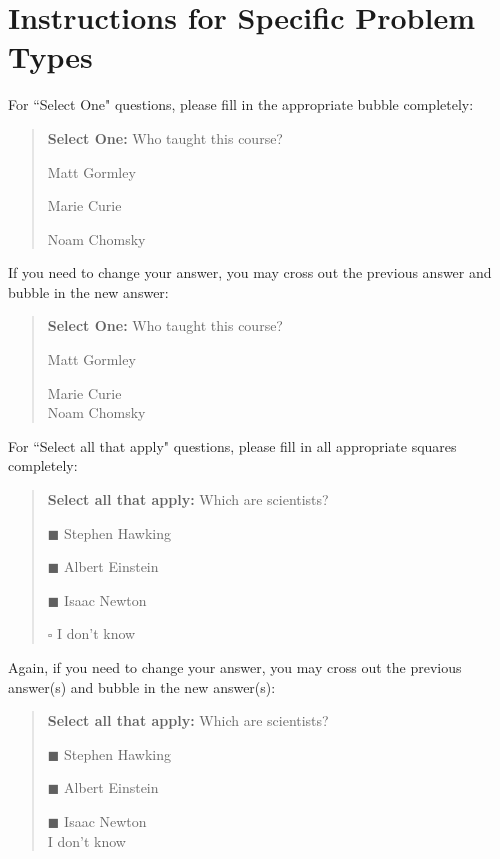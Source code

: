 \section*{Instructions for Specific Problem Types}

For ``Select One" questions, please fill in the appropriate bubble completely:

\begin{quote}
\textbf{Select One:} Who taught this course?
\begin{list}{}
     \item\CIRCLE{} Matt Gormley
     \item\Circle{} Marie Curie
     \item\Circle{} Noam Chomsky
\end{list}
\end{quote}

If you need to change your answer, you may cross out the previous answer and bubble in the new answer:

\begin{quote}
\textbf{Select One:} Who taught this course?
\begin{list}{}
     \item\CIRCLE{} Matt Gormley
     \item\Circle{} Marie Curie\\
     \xcancel{\CIRCLE}{} Noam Chomsky
\end{list}
\end{quote}


For ``Select all that apply" questions, please fill in all appropriate squares completely:

\begin{quote}
\textbf{Select all that apply:} Which are scientists?
    \begin{list}{}
    \item $\blacksquare$ Stephen Hawking 
    \item $\blacksquare$ Albert Einstein
    \item $\blacksquare$ Isaac Newton
    \item $\square$ I don't know
\end{list}
\end{quote}

Again, if you need to change your answer, you may cross out the previous answer(s) and bubble in the new answer(s):

\begin{quote}
\textbf{Select all that apply:} Which are scientists?
    \begin{list}{}
    \item $\blacksquare$ Stephen Hawking 
    \item $\blacksquare$ Albert Einstein
    \item $\blacksquare$ Isaac Newton\\
    \xcancel{$\blacksquare$} I don't know
\end{list}
\end{quote}

